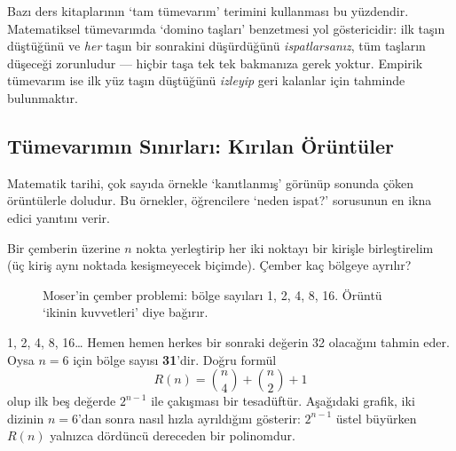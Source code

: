 Bazı ders kitaplarının ‘tam tümevarım’ terimini kullanması bu yüzdendir. Matematiksel tümevarımda ‘domino taşları’ benzetmesi yol göstericidir: ilk taşın düştüğünü ve \emph{her} taşın bir sonrakini düşürdüğünü \emph{ispatlarsanız}, tüm taşların düşeceği zorunludur — hiçbir taşa tek tek bakmanıza gerek yoktur. Empirik tümevarım ise ilk yüz taşın düştüğünü \emph{izleyip} geri kalanlar için tahminde bulunmaktır.

\subsection{Tümevarımın Sınırları: Kırılan Örüntüler}

Matematik tarihi, çok sayıda örnekle ‘kanıtlanmış’ görünüp sonunda çöken örüntülerle doludur. Bu örnekler, öğrencilere ‘neden ispat?’ sorusunun en ikna edici yanıtını verir.

\begin{ornek}
Bir çemberin üzerine $n$ nokta yerleştirip her iki noktayı bir kirişle birleştirelim (üç kiriş aynı noktada kesişmeyecek biçimde). Çember kaç bölgeye ayrılır?
\end{ornek}

\begin{figure}[h]
\centering
{}
\caption{Moser’in çember problemi: bölge sayıları 1, 2, 4, 8, 16. Örüntü ‘ikinin kuvvetleri’ diye bağırır.}
\end{figure}

1, 2, 4, 8, 16… Hemen hemen herkes bir sonraki değerin 32 olacağını tahmin eder. Oysa $n=6$ için bölge sayısı \textbf{31}’dir. Doğru formül
\[
R(n)=\binom{n}{4}+\binom{n}{2}+1
\]
olup ilk beş değerde $2^{n-1}$ ile çakışması bir tesadüftür. Aşağıdaki grafik, iki dizinin $n=6$’dan sonra nasıl hızla ayrıldığını gösterir: $2^{n-1}$ üstel büyürken $R(n)$ yalnızca dördüncü dereceden bir polinomdur.

